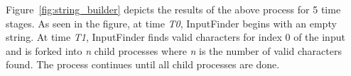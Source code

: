\documentclass[10pt,twocolumn]{article}
\def \tool {InputFinder}
\begin{document}
Figure~\ref{fig:string_builder} depicts the results of the above process for 5 time stages.
As seen in the figure, at time \textit{T0}, \tool{} begins with an empty string.
At time \textit{T1}, \tool{} finds valid characters for index 0 of the input and is forked into \textit{n} child processes where \textit{n} is the number of valid characters found.
The process continues until all child processes are done. 




\end{document}
